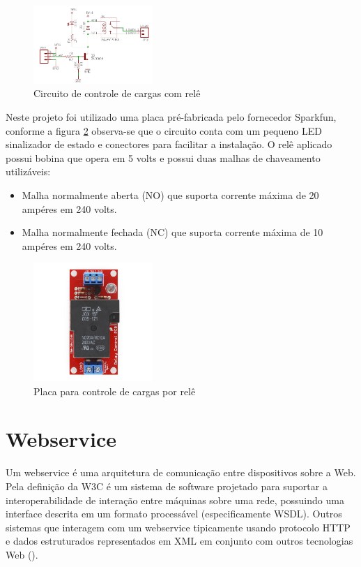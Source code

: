 \begin{figure}[h!]
			\centering
			\includegraphics[width=0.4\textwidth]{figures/circRele.png}
			\caption{Circuito de controle de cargas com relê}
			\label{fig:relay}
\end{figure}

Neste projeto foi utilizado uma placa pré-fabricada pelo fornecedor Sparkfun, conforme a figura \ref{fig:placarelay} observa-se que o circuito conta com um pequeno LED sinalizador de estado e conectores para facilitar a instalação. O relê aplicado possui bobina que opera em 5 volts e possui duas malhas de chaveamento utilizáveis:

\begin{itemize}
	\item Malha normalmente aberta (NO) que suporta corrente máxima de 20 ampéres em 240 volts.
	\item Malha normalmente fechada (NC) que suporta corrente máxima de 10 ampéres em 240 volts.
\end{itemize}

\begin{figure}[h!]
			\centering
			\includegraphics[width=0.4\textwidth]{figures/beefCake2.jpg}
			\caption{Placa para controle de cargas por relê}
			\label{fig:placarelay}
\end{figure}

\section{Webservice}

Um webservice é uma arquitetura de comunicação entre dispositivos sobre a Web. Pela definição da W3C é um sistema de software projetado para suportar a interoperabilidade de interação entre máquinas sobre uma rede, possuindo uma interface descrita em um formato processável (especificamente WSDL). Outros sistemas que interagem com um webservice tipicamente usando protocolo HTTP e dados estruturados representados em XML em conjunto com outros tecnologias Web (\textcite{w3c_ws:2004}).

